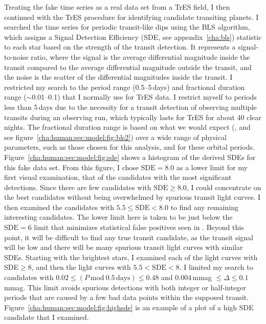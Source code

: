 Treating the fake time series as a real data set from a TrES field, I then continued with the TrES procedure for identifying candidate transiting planets.
I searched the time series for periodic transit-like dips using the BLS algorithm, which assigns a Signal Detection Efficiency (SDE, see appendix~\ref{cha:bls}) statistic to each star based on the strength of the transit detection.
It represents a signal-to-noise ratio, where the signal is the average differential magnitude inside the transit compared to the average differential magnitude outside the transit, and the noise is the scatter of the differential magnitudes inside the transit.
I restricted my search to the period range (0.5--5\,days) and fractional duration range ($\sim$0.01--0.1) that I normally use for TrES data.
I restrict myself to periods less than 5\,days due to the necessity for a transit detection of observing multiple transits during an observing run, which typically lasts for TrES for about 40 clear nights.
The fractional duration range is based on what we would expect (\citealp*{Defay_Deleuil_Barge:aa:2001a}, and see figure~\ref{cha:human:sec:model:fig:bls2}) over a wide range of physical parameters, such as those chosen for this analysis, and for these orbital periods. Figure~\ref{cha:human:sec:model:fig:sde} shows a histogram of the derived SDEs for this fake data set.
From this figure, I chose $\mathrm{SDE}=8.0$ as a lower limit for my first visual examination, that of the candidates with the most significant detections.
Since there are few candidates with $\mathrm{SDE}\geq8.0$, I could concentrate on the best candidates without being overwhelmed by spurious transit light curves.
I then examined the candidates with $5.5 \leq \mathrm{SDE} < 8.0$ to find any remaining interesting candidates.
The lower limit here is taken to be just below the $\mathrm{SDE}=6$ limit that minimizes statistical false positives seen in \citet{Kovacs_Zucker_Mazeh:aa:2002a}.
Beyond this point, it will be difficult to find any true transit candidate, as the transit signal will be low and there will be many spurious transit light curves with similar SDEs.
Starting with the brightest stars, I examined each of the light curves with SDE$\geq8$, and then the light curves with $5.5<\mathrm{SDE}<8$.
I limited my search to candidates with $0.02 \leq (P\ \mathrm{mod}\ 0.5\,\mathrm{days})\leq 0.48$ and 0.004\,mmag $\leq \Delta \leq 0.1$\,mmag.
This limit avoids spurious detections with both integer or half-integer periods that are caused by a few bad data points within the supposed transit. Figure~\ref{cha:human:sec:model:fig:highsde} is an example of a plot of a high SDE candidate that I examined.

